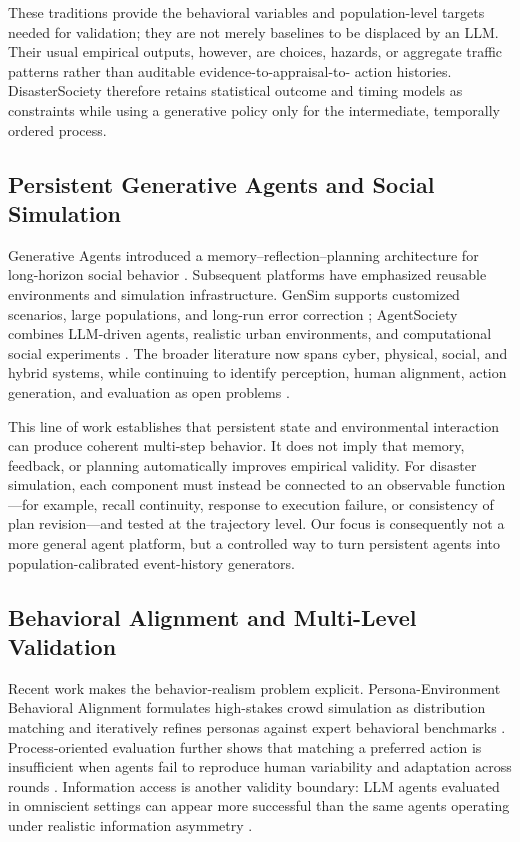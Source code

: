 \documentclass[journal]{IEEEtran}
\newcommand{\method}{DisasterSociety}
\begin{document}
These traditions provide the behavioral variables and population-level
targets needed for validation; they are not merely baselines to be displaced
by an LLM. Their usual empirical outputs, however, are choices, hazards, or
aggregate traffic patterns rather than auditable evidence-to-appraisal-to-
action histories. \method{} therefore retains statistical outcome and timing
models as constraints while using a generative policy only for the
intermediate, temporally ordered process.

\subsection{Persistent Generative Agents and Social Simulation}
Generative Agents introduced a memory--reflection--planning architecture for
long-horizon social behavior \cite{park2023generative}. Subsequent platforms
have emphasized reusable environments and simulation infrastructure. GenSim
supports customized scenarios, large populations, and long-run error
correction \cite{tang2024gensim}; AgentSociety combines LLM-driven agents,
realistic urban environments, and computational social experiments
\cite{piao2025agentsociety}. The broader literature now spans cyber, physical,
social, and hybrid systems, while continuing to identify perception, human
alignment, action generation, and evaluation as open problems
\cite{gao2023llmabm}.

This line of work establishes that persistent state and environmental
interaction can produce coherent multi-step behavior. It does not imply that
memory, feedback, or planning automatically improves empirical validity.
For disaster simulation, each component must instead be connected to an
observable function---for example, recall continuity, response to execution
failure, or consistency of plan revision---and tested at the trajectory level.
Our focus is consequently not a more general agent platform, but a controlled
way to turn persistent agents into population-calibrated event-history
generators.

\subsection{Behavioral Alignment and Multi-Level Validation}
Recent work makes the behavior-realism problem explicit. Persona-Environment
Behavioral Alignment formulates high-stakes crowd simulation as distribution
matching and iteratively refines personas against expert behavioral
benchmarks \cite{wang2025alignment}. Process-oriented evaluation further shows
that matching a preferred action is insufficient when agents fail to
reproduce human variability and adaptation across rounds
\cite{feng2025fidelity}. Information access is another validity boundary:
LLM agents evaluated in omniscient settings can appear more successful than
the same agents operating under realistic information asymmetry
\cite{zhou2024fantasy}.
\end{document}
